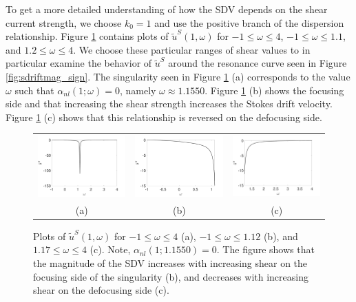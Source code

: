\documentclass{JFM_Style/jfm}
\begin{document}
To get a more detailed understanding of how the SDV depends on the shear current strength, we choose $k_{0}=1$ and use the positive branch of the dispersion relationship.  Figure \ref{fig:stksdrfcomp} contains plots of $\tilde{u}^{S}(1,\omega)$ for $-1\leq \omega\leq 4$, $-1\leq \omega \leq 1.1$, and $1.2\le\omega\le4$.  We choose these particular ranges of shear values to in particular examine the behavior of $\tilde{u}^{S}$ around the resonance curve seen in Figure \ref{fig:sdriftmag_sign}.  The singularity seen in Figure \ref{fig:stksdrfcomp} (a) corresponds to the value $\omega$ such that $\alpha_{nl}(1;\omega)=0$, namely $\omega\approx1.1550$.  Figure \ref{fig:stksdrfcomp} (b) shows the focusing side and that increasing the shear strength increases the Stokes drift velocity.  Figure \ref{fig:stksdrfcomp} (c) shows that this relationship is reversed on the defocusing side.  
\begin{figure}
\centering
\begin{tabular}{ccc}
\includegraphics[width=.32\textwidth]{us_wide_range} & \includegraphics[width=.32\textwidth]{us_n1_to_1pt1} & \includegraphics[width=.32\textwidth]{us_1pt2_to_4}\\
(a) & (b) & (c)
\end{tabular}
\caption{\small Plots of $\tilde{u}^{S}(1,\omega)$ for $-1\leq \omega \leq 4$ (a), $-1\leq \omega \leq 1.12$ (b), and $1.17\leq \omega \leq 4$ (c).  Note, $\alpha_{nl}(1;1.1550)=0$.  The figure shows that the magnitude of the SDV increases with increasing shear on the focusing side of the singularity (b), and decreases with increasing shear on the defocusing side (c).}
\label{fig:stksdrfcomp}
\end{figure}
\end{document}
